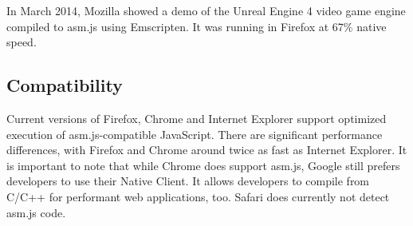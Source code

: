 In March 2014, Mozilla showed a demo of the Unreal Engine 4 video game engine compiled to asm.js using Emscripten. It was running in Firefox at 67\% native speed. \cite{ue4ff}


\subsection{Compatibility}

Current versions of Firefox, Chrome and Internet Explorer support optimized execution of asm.js-compatible JavaScript. There are significant performance differences, with Firefox and Chrome around twice as fast as Internet Explorer. It is important to note that while Chrome does support asm.js, Google still prefers developers to use their Native Client. It allows developers to compile from C/C++ for performant web applications, too. Safari does currently not detect asm.js code. \cite{asm.js_comp}
